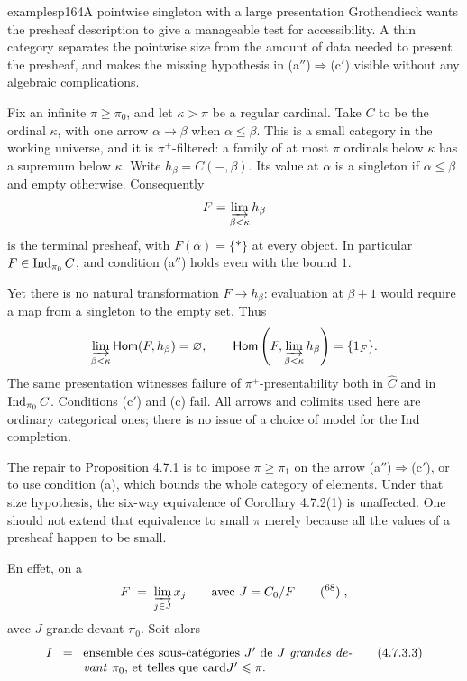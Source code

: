 \begin{dcomment}{examples}{p164}{A pointwise singleton with a large presentation}
Grothendieck wants the presheaf description to give a manageable test for accessibility. A thin category separates the pointwise size from the amount of data needed to present the presheaf, and makes the missing hypothesis in (a$''$)$\Rightarrow$(c$'$) visible without any algebraic complications.

Fix an infinite $\pi\geq\pi_0$, and let $\kappa>\pi$ be a regular cardinal. Take $C$ to be the ordinal $\kappa$, with one arrow $\alpha\to\beta$ when $\alpha\leq\beta$. This is a small category in the working universe, and it is $\pi^+$-filtered: a family of at most $\pi$ ordinals below $\kappa$ has a supremum below $\kappa$. Write $h_\beta=C(-,\beta)$. Its value at $\alpha$ is a singleton if $\alpha\leq\beta$ and empty otherwise. Consequently
\[
 F=\varinjlim_{\beta<\kappa}h_\beta
\]
is the terminal presheaf, with $F(\alpha)=\{*\}$ at every object. In particular $F\in\operatorname{Ind}_{\pi_0}C$, and condition (a$''$) holds even with the bound $1$.

Yet there is no natural transformation $F\to h_\beta$: evaluation at $\beta+1$ would require a map from a singleton to the empty set. Thus
\[
 \varinjlim_{\beta<\kappa}\mathsf{Hom}(F,h_\beta)=\varnothing,
 \qquad
 \mathsf{Hom}\left(F,\varinjlim_{\beta<\kappa}h_\beta\right)=\{1_F\}.
\]
The same presentation witnesses failure of $\pi^+$-presentability both in $\widehat C$ and in $\operatorname{Ind}_{\pi_0}C$. Conditions (c$'$) and (c) fail. All arrows and colimits used here are ordinary categorical ones; there is no issue of a choice of model for the Ind completion.

The repair to Proposition 4.7.1 is to impose $\pi\geq\pi_1$ on the arrow (a$''$)$\Rightarrow$(c$'$), or to use condition (a), which bounds the whole category of elements. Under that size hypothesis, the six-way equivalence of Corollary 4.7.2(1) is unaffected. One should not extend that equivalence to small $\pi$ merely because all the values of a presheaf happen to be small.
\end{dcomment}


En effet, on a
\[
F \;=\; \varinjlim_{j \in J} x_j \qquad \text{avec } J = C_0/F \qquad \text{(\footnotemark[68])}\;,
\]
avec $J$ grande devant $\pi_0$. Soit alors
\[
I \;\;=\;\; \parbox[t]{0.62\textwidth}{ensemble des sous-catégories $J'$ de $J$ \textit{grandes devant} $\pi_0$, et telles que $\card J' \leqslant \pi$.} \tag*{(4.7.3.3)}
\]

